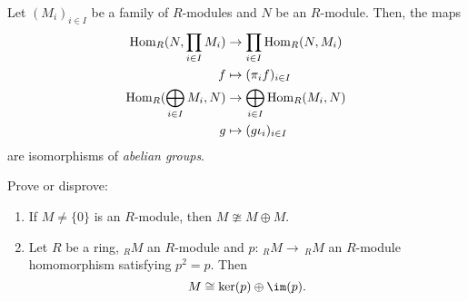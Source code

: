 \begin{theorem}
    Let $(M_i)_{i \in I}$ be a family of $R$-modules and $N$ be an $R$-module. Then, the maps
    \begin{align*}
        \operatorname{\text{Hom}}_R(N, \prod_{i \in I} M_i) &\to \prod_{i \in I} \operatorname{\text{Hom}}_R(N,M_i)\\
        f &\mapsto (\pi_i f)_{i \in I}\\
        \operatorname{\text{Hom}}_R(\bigoplus_{i \in I} M_i, N) &\to \bigoplus_{i \in I} \operatorname{\text{Hom}}_R(M_i, N)\\
        g &\mapsto (g \iota_i)_{i \in I}
    \end{align*}
    are isomorphisms of \emph{abelian groups}.
\end{theorem}
\begin{ex}
   Prove or disprove:
   \begin{enumerate}
       \item If $M \neq \{0\}$ is an $R$-module, then $M \ncong M \oplus M$. 
        \item Let $R$ be a ring, $_R M$ an $R$-module and $p:\, _RM \to \, _RM$ an $R$-module homomorphism satisfying $p^2=p$. Then \[
        M \cong \ker(p) \oplus \im(p)
        .\] 
   \end{enumerate}
\end{ex}
